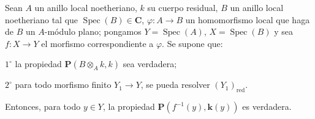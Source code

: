 \begin{proposition}[7.9.8]
\label{IV.2.s7.9.8-fr}
Sean $A$ un anillo local noetheriano, $k$ su cuerpo residual, $B$ un anillo
local noetheriano tal que $\operatorname{Spec}(B)\in\boldsymbol{C}$,
$\varphi:A\to B$ un homomorfismo local que haga de $B$ un $A$-módulo plano;
pongamos $Y=\operatorname{Spec}(A)$, $X=\operatorname{Spec}(B)$ y sea
$f:X\to Y$ el morfismo correspondiente a $\varphi$. Se supone que:

$1^\circ$ la propiedad $\boldsymbol P(B\otimes_A k,k)$ sea verdadera;

$2^\circ$ para todo morfismo finito $Y_1\to Y$, se pueda resolver
$(Y_1)_{\mathrm{red}}$.

Entonces, para todo $y\in Y$, la propiedad
$\boldsymbol P(f^{-1}(y),\boldsymbol{k}(y))$ es verdadera.
\end{proposition}

